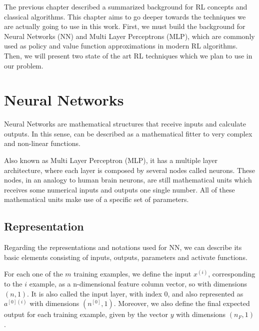 
The previous chapter described a summarized background for RL concepts and classical algorithms. This chapter aims to go deeper towards the techniques we are actually going to use in this work. First, we must build the background for Neural Networks (NN) and Multi Layer Perceptrons (MLP), which are commonly used as policy and value function approximations in modern RL algorithms. Then, we will present two state of the art RL techniques which we plan to use in our problem.

\section{Neural Networks}

Neural Networks are mathematical structures that receive inputs and calculate outputs. In this sense, can be described as a mathematical fitter to very complex and non-linear functions.

Also known as Multi Layer Perceptron (MLP), it has a multiple layer architecture, where each layer is composed by several nodes called neurons. These nodes, in an analogy to human brain neurons, are still mathematical units which receives some numerical inputs and outputs one single number. All of these mathematical units make use of a specific set of parameters.

\subsection{Representation}

Regarding the representations and notations used for NN, we can describe its basic elements consisting of inputs, outputs, parameters and activate functions.

For each one of the $m$ training examples, we define the input $x^{(i)}$, corresponding to the $i$ example, as a n-dimensional feature column vector, so with dimensions $(n,1)$. It is also called the input layer, with index $0$, and also represented as $a^{[0](i)}$ with dimensions $(n^{[0]},1)$. Moreover, we also define the final expected output for each training example, given by the vector $y$ with dimensions $(n_F,1)$.

